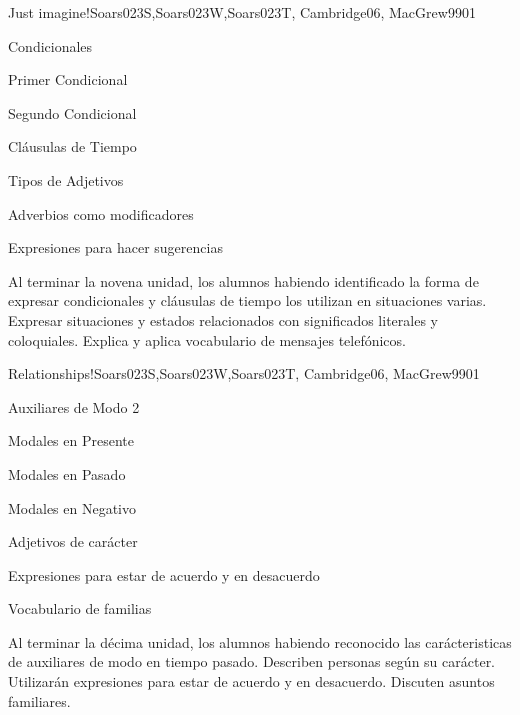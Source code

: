 \begin{syllabus}
\begin{unit}{Just imagine!}{Soars023S,Soars023W,Soars023T, Cambridge06, MacGrew99}{0}{1}
   \begin{topics}
      \item Condicionales
      \item Primer Condicional
      \item Segundo Condicional
      \item Cláusulas de Tiempo
      \item Tipos de Adjetivos
      \item Adverbios como modificadores
      \item Expresiones para hacer sugerencias
   \end{topics}

   \begin{learningoutcomes}
      \item Al terminar la novena unidad, los alumnos habiendo identificado la forma de expresar condicionales y cláusulas de tiempo los utilizan en situaciones varias. Expresar situaciones y estados relacionados con significados literales y coloquiales. Explica y aplica vocabulario de mensajes telefónicos.
   \end{learningoutcomes}

\end{unit}

\begin{unit}{Relationships!}{Soars023S,Soars023W,Soars023T, Cambridge06, MacGrew99}{0}{1}
   \begin{topics}
      \item Auxiliares de Modo 2
      \item Modales en Presente
      \item Modales en Pasado
      \item Modales en Negativo
      \item Adjetivos de carácter
      \item Expresiones para estar de acuerdo y en desacuerdo
      \item Vocabulario de familias
   \end{topics}

   \begin{learningoutcomes}
      \item Al terminar la décima unidad, los alumnos habiendo reconocido las carácteristicas  de auxiliares de modo en tiempo pasado. Describen personas según su carácter. Utilizarán expresiones para estar de acuerdo y en desacuerdo. Discuten asuntos familiares. 
   \end{learningoutcomes}


\end{unit}
\end{syllabus}
